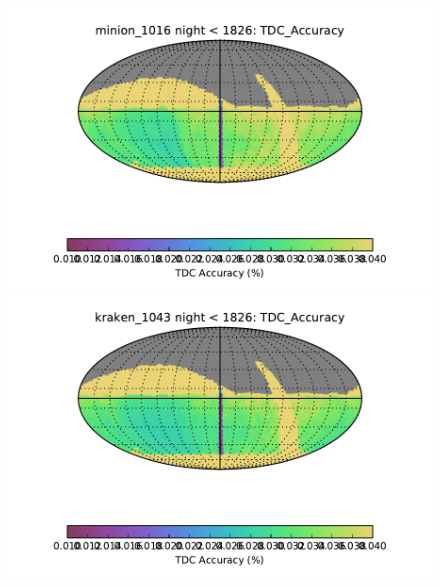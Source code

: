 \begin{figure}[!ht]
\begin{minipage}[b]{\linewidth}
\begin{minipage}[b]{0.48\linewidth}
       \centering\includegraphics[width=\linewidth]{figs/lenstimedelays/minion_1016_TDC_Accuracy_night_lt_1826_HEAL_SkyMap.pdf}
    \end{minipage} \hfill
    \begin{minipage}[b]{0.48\linewidth}
       \centering\includegraphics[width=\linewidth]{figs/lenstimedelays/kraken_1043_TDC_Accuracy_night_lt_1826_HEAL_SkyMap.pdf}
    \end{minipage}
  \end{minipage}
  \begin{minipage}[b]{\linewidth}
    \begin{minipage}[b]{0.48\linewidth}

\end{minipage}
\end{minipage}
\end{figure}
